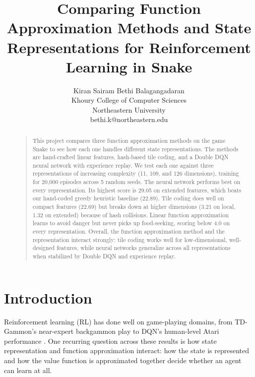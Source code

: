\documentclass[letterpaper]{article}
\begin{document}
\title{Comparing Function Approximation Methods and State Representations for Reinforcement Learning in Snake}
\author{
Kiran Sairam Bethi Balagangadaran\\
Khoury College of Computer Sciences\\
Northeastern University\\
bethi.k@northeastern.edu
}
\maketitle

\begin{abstract}
\begin{quote}
This project compares three function approximation methods on the game Snake to see how each one handles different state representations. The methods are hand-crafted linear features, hash-based tile coding, and a Double DQN neural network with experience replay. We test each one against three representations of increasing complexity (11, 109, and 126 dimensions), training for 20,000 episodes across 5 random seeds. The neural network performs best on every representation. Its highest score is 29.05 on extended features, which beats our hand-coded greedy heuristic baseline (22.89). Tile coding does well on compact features (22.69) but breaks down at higher dimensions (3.21 on local, 1.32 on extended) because of hash collisions. Linear function approximation learns to avoid danger but never picks up food-seeking, scoring below 4.0 on every representation. Overall, the function approximation method and the representation interact strongly: tile coding works well for low-dimensional, well-designed features, while neural networks generalize across all representations when stabilized by Double DQN and experience replay.
\end{quote}
\end{abstract}

\section{Introduction}

Reinforcement learning (RL) has done well on game-playing domains, from TD-Gammon's near-expert backgammon play \cite{tesauro1995tdgammon} to DQN's human-level Atari performance \cite{mnih2015dqn}. One recurring question across these results is how state representation and function approximation interact: how the state is represented and how the value function is approximated together decide whether an agent can learn at all.
\end{document}
